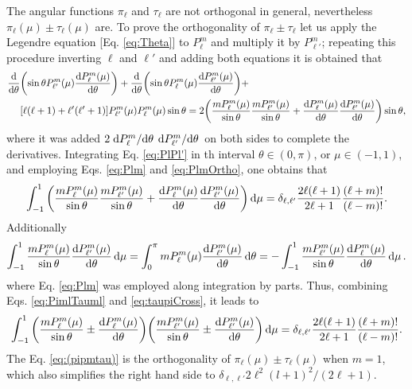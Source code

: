 The angular functions $\pi_\ell$  and $\tau_\ell$ are not orthogonal in general, nevertheless  $\pi_\ell(\mu)\pm\tau_\ell(\mu)$ are. To prove the orthogonality of $\pi_\ell\pm\tau_\ell$ let us apply the Legendre equation [Eq. \eqref{eq:Theta}] to $P_\ell^m$ and multiply it by $P_{\ell'}^m$; repeating this procedure inverting $\ell$ and $\ell'$ and adding both equations it is obtained that
%
\begin{align}
\dv{\theta}&\qty(\sin\theta P_{\ell'}^m(\mu)\dv{P_\ell^m(\mu)}{\theta}) +
\dv{\theta}\qty(\sin\theta P_{\ell}^m(\mu)\dv{P_{\ell'}^m(\mu)}{\theta}) +
\label{eq:PlPl'}
\\
&\qty[\ell(\ell+1)+\ell'(\ell'+1)]P_{\ell'}^m(\mu)P_{\ell}^m(\mu) \sin\theta
=
 2\qty(\frac{mP_\ell^m(\mu)}{\sin\theta}\frac{mP_{\ell'}^m(\mu)}{\sin\theta}+ \dv{P_\ell^m(\mu)}{\theta}\dv{P_{\ell'}^m(\mu)}{\theta})\sin\theta,\notag
\end{align}
%
where  it was added $2\dv*{P_\ell^m}{\theta}\dv*{P_{\ell'}^m}{\theta}$ on both sides to complete the derivatives. Integrating Eq. \eqref{eq:PlPl'} in th interval $\theta \in (0,\pi)$, or $\mu \in(-1,1)$, and employing Eqs. \eqref{eq:Plm} and \eqref{eq:PlmOrtho}, one obtains that
%
\begin{align}
\int_{-1}^1 \qty(\frac{mP_\ell^m(\mu)}{\sin\theta}\frac{mP_{\ell'}^m(\mu)}{\sin\theta}+ \dv{P_\ell^m(\mu)}{\theta}\dv{P_{\ell'}^m(\mu)}{\theta})\dd{\mu} =
\delta_{\ell,\ell'}\frac{2\ell(\ell+1)}{2\ell+1}\frac{(\ell+m)!}{(\ell-m)!}.
\label{eq:PimlTauml}
\end{align}
%
Additionally
%
\begin{align}
\int_{-1}^1\frac{mP_\ell^m(\mu)}{\sin\theta}\dv{P_{\ell'}^m(\mu)}{\theta}\dd{\mu}
 = \int_0^{\pi} mP_\ell^m(\mu)\dv{P_{\ell'}^m(\mu)}{\theta}\dd{\theta} =
 -\int_{-1}^1\frac{mP_{\ell'}^m(\mu)}{\sin\theta}\dv{P_{\ell}^m(\mu)}{\theta}\dd{\mu}.
 \label{eq:taupiCross}
\end{align}
%
where Eq. \eqref{eq:Plm} was employed along integration by parts. Thus, combining Eqs. \eqref{eq:PimlTauml} and \eqref{eq:taupiCross}, it leads to
%
\begin{align}
\int_{-1}^{1}\qty(\frac{mP_\ell^m(\mu)}{\sin\theta}\pm\dv{P_\ell^m(\mu)}{\theta})\qty(\frac{mP_{\ell'}^m(\mu)}{\sin\theta}\pm\dv{P_{\ell'}^m(\mu)}{\theta})\dd{\mu}
 =  \delta_{\ell,\ell'}\frac{2\ell(\ell+1)}{2\ell+1}\frac{(\ell+m)!}{(\ell-m)!}.
 \label{eq:(pipmtau)}
\end{align}
%
The Eq. \eqref{eq:(pipmtau)}  is the orthogonality of $\pi_\ell(\mu)\pm\tau_\ell(\mu)$ when $m = 1$, which also simplifies the right hand side to $\delta_{\ell,\ell'} 2\ell^2(l+1)^2/(2\ell+1)$.


